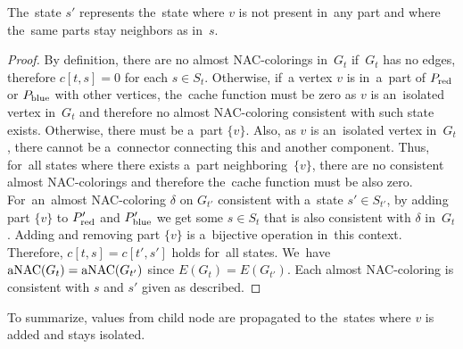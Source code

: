 %
The~state \( s' \) represents the~state where \( v \) is not present in~any part
and where the~same parts stay neighbors as in~\( s \).
%
\begin{proof}
	By definition, there are no almost NAC-colorings
	in~\( G_t \) if~\( G_t \) has no edges,
	therefore \( c[t, s] = 0 \) for each \( s \in S_t \).
	Otherwise, if~a vertex \( v \) is in~a~part of \( P_{\text{red}} \) or \( P_{\text{blue}} \) with other vertices,
	the~cache function must be zero as \( v \) is an~isolated vertex in~\( G_t \)
	and therefore no almost NAC-coloring consistent with such state exists.
	Otherwise, there must be a~part \( \{v\} \).
	Also, as \( v \) is an~isolated vertex in~\( G_t \), there cannot be a~connector
	connecting this and another component.
	Thus, for~all states where there exists
	a~part neighboring~\( \{v\} \), there are no consistent almost NAC-colorings
	and therefore the~cache function must be also zero.
	For~an~almost NAC-coloring \( \delta \) on \( G_{t'} \) consistent with
	a~state \( s' \in S_{t'} \),
	by adding part \( \{v\} \) to \( P_{\text{red}}' \) and \( P_{\text{blue}}' \)
	we get some \( s \in S_t \) that is also consistent with \( \delta \) in~\( G_t \).
	Adding and removing part \( \{v\} \) is a~bijective operation in~this context.
	Therefore, \( c[t, s] = c[t', s'] \) holds for~all states.
	We~have \( \operatorname{aNAC}(G_t) = \operatorname{aNAC}(G_{t'}) \) since \( E(G_t) = E(G_{t'}) \).
	Each almost NAC-coloring is consistent
	with \( s \) and \( s' \) given as described.
\end{proof}
%
To summarize, values from child node are propagated to the~states
where \( v \) is added and stays isolated.

